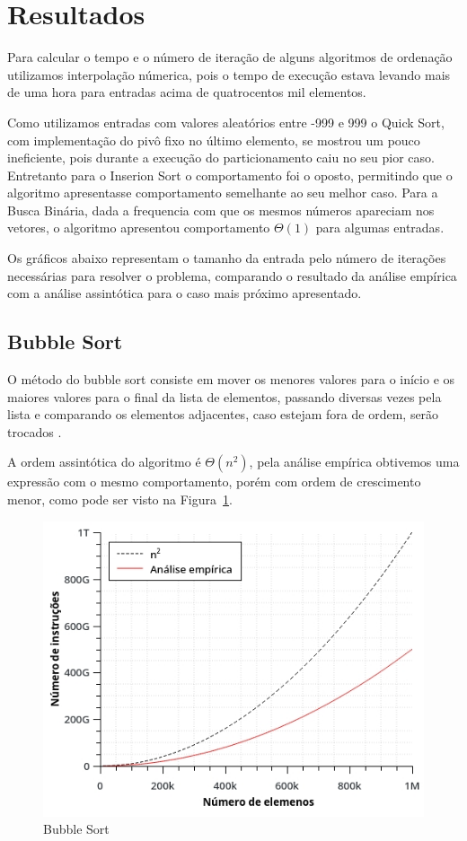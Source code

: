 \section{Resultados} \label{sec:resultados}
Para calcular o tempo e o número de iteração de alguns algoritmos de ordenação utilizamos interpolação númerica, pois o tempo de execução estava levando mais de uma hora para entradas acima de quatrocentos mil elementos.

Como utilizamos entradas com valores aleatórios entre -999 e 999 o Quick Sort, com implementação do pivô fixo no último elemento, se mostrou um pouco ineficiente, pois durante a execução do particionamento caiu no seu pior caso. Entretanto para o Inserion Sort o comportamento foi o oposto, permitindo que o algoritmo apresentasse comportamento semelhante ao seu melhor caso. Para a Busca Binária, dada a frequencia com que os mesmos números apareciam nos vetores, o algoritmo apresentou comportamento $\Theta(1)$ para algumas entradas.

Os gráficos abaixo representam o tamanho da entrada pelo número de iterações necessárias para resolver o problema, comparando o resultado da análise empírica com a análise assintótica para o caso mais próximo apresentado.

\subsection{Bubble Sort}
O método do bubble sort consiste em mover os menores valores para o início e os maiores valores para o final da lista de elementos, passando diversas vezes pela lista e comparando os elementos adjacentes, caso estejam fora de ordem, serão trocados \cite{mcconnell:01}.

A ordem assintótica do algoritmo é $\Theta(n^2)$, pela análise empírica obtivemos uma expressão com o mesmo comportamento, porém com ordem de crescimento menor, como pode ser visto na Figura~\ref{fig:bubble}.
\begin{figure}[h]
\centering
\includegraphics[scale=0.7]{images/bubble_graph.jpg}
\caption{Bubble Sort}
\label{fig:bubble}
\end{figure}

